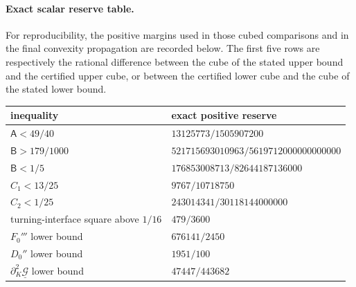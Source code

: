 \documentclass[11pt]{article}
\theoremstyle{remark}
\begin{document}
\paragraph{Exact scalar reserve table.}
For reproducibility, the positive margins used in those cubed comparisons
and in the final convexity propagation are recorded below.  The first five
rows are respectively the rational difference between the cube of the stated
upper bound and the certified upper cube, or between the certified lower cube
and the cube of the stated lower bound.
\begin{center}
\small
\begin{tabular}{@{}ll@{}}
\toprule
inequality&exact positive reserve\\
\midrule
\(\mathsf A<49/40\)&\(13125773/1505907200\)\\
\(\mathsf B>179/1000\)&
\(521715693010963/5619712000000000000\)\\
\(\mathsf B<1/5\)&\(176853008713/82644187136000\)\\
\(C_1<13/25\)&\(9767/10718750\)\\
\(C_2<1/25\)&\(243014341/30118144000000\)\\
turning-interface square above \(1/16\)&\(479/3600\)\\
\(F_0'''\) lower bound&\(676141/2450\)\\
\(D_0''\) lower bound&\(1951/100\)\\
\(\partial_K^2\underline{\mathcal G}\) lower bound&
\(47447/443682\)\\
\bottomrule
\end{tabular}
\end{center}
\end{document}
